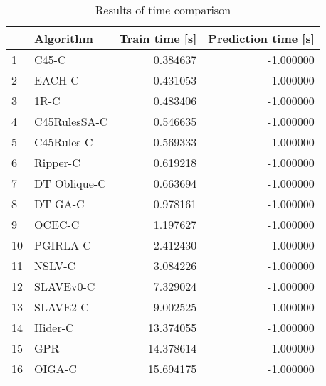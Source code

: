 \begin{table}
\footnotesize
\caption{Results of time comparison}
\label{tab:time comparison}
\begin{tabular}{llrr}
\hline
 & Algorithm & Train time [s] & Prediction time [s] \\
\hline
1 & C45-C & 0.384637 & -1.000000 \\
2 & EACH-C & 0.431053 & -1.000000 \\
3 & 1R-C & 0.483406 & -1.000000 \\
4 & C45RulesSA-C & 0.546635 & -1.000000 \\
5 & C45Rules-C & 0.569333 & -1.000000 \\
6 & Ripper-C & 0.619218 & -1.000000 \\
7 & DT Oblique-C & 0.663694 & -1.000000 \\
8 & DT GA-C & 0.978161 & -1.000000 \\
9 & OCEC-C & 1.197627 & -1.000000 \\
10 & PGIRLA-C & 2.412430 & -1.000000 \\
11 & NSLV-C & 3.084226 & -1.000000 \\
12 & SLAVEv0-C & 7.329024 & -1.000000 \\
13 & SLAVE2-C & 9.002525 & -1.000000 \\
14 & Hider-C & 13.374055 & -1.000000 \\
15 & GPR & 14.378614 & -1.000000 \\
16 & OIGA-C & 15.694175 & -1.000000 \\
\hline
\end{tabular}
\end{table}
